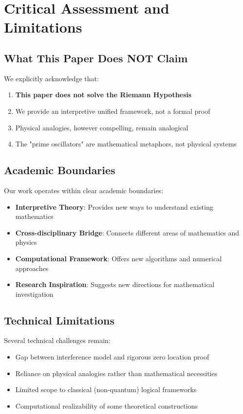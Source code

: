 \documentclass[12pt]{article}
\theoremstyle{plain}
\theoremstyle{definition}
\begin{document}
\section{Critical Assessment and Limitations}

\subsection{What This Paper Does NOT Claim}

We explicitly acknowledge that:
\begin{enumerate}
\item \textbf{This paper does not solve the Riemann Hypothesis}
\item We provide an interpretive unified framework, not a formal proof
\item Physical analogies, however compelling, remain analogical
\item The "prime oscillators" are mathematical metaphors, not physical systems
\end{enumerate}

\subsection{Academic Boundaries}

Our work operates within clear academic boundaries:
\begin{itemize}
\item \textbf{Interpretive Theory}: Provides new ways to understand existing mathematics
\item \textbf{Cross-disciplinary Bridge}: Connects different areas of mathematics and physics
\item \textbf{Computational Framework}: Offers new algorithms and numerical approaches
\item \textbf{Research Inspiration}: Suggests new directions for mathematical investigation
\end{itemize}

\subsection{Technical Limitations}

Several technical challenges remain:
\begin{itemize}
\item Gap between interference model and rigorous zero location proof
\item Reliance on physical analogies rather than mathematical necessities
\item Limited scope to classical (non-quantum) logical frameworks
\item Computational realizability of some theoretical constructions
\end{itemize}
\end{document}
